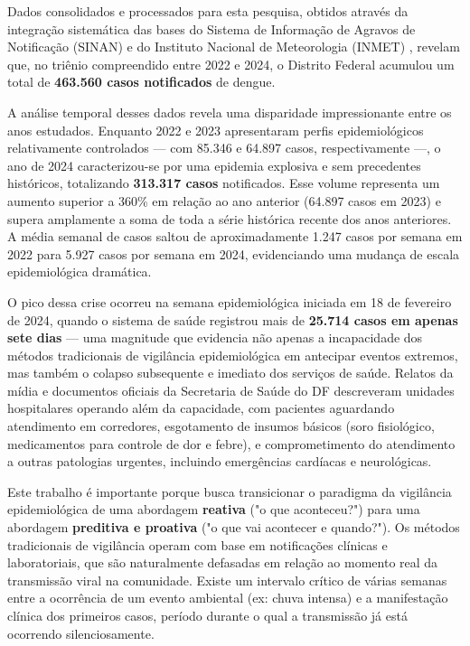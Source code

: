 Dados consolidados e processados para esta pesquisa, obtidos através da integração sistemática das bases do Sistema de Informação de Agravos de Notificação (SINAN) e do Instituto Nacional de Meteorologia (INMET) \cite{sinan2025, inmet2025}, revelam que, no triênio compreendido entre 2022 e 2024, o Distrito Federal acumulou um total de \textbf{463.560 casos notificados} de dengue. 

A análise temporal desses dados revela uma disparidade impressionante entre os anos estudados. Enquanto 2022 e 2023 apresentaram perfis epidemiológicos relativamente controlados — com 85.346 e 64.897 casos, respectivamente —, o ano de 2024 caracterizou-se por uma epidemia explosiva e sem precedentes históricos, totalizando \textbf{313.317 casos} notificados. Esse volume representa um aumento superior a 360\% em relação ao ano anterior (64.897 casos em 2023) e supera amplamente a soma de toda a série histórica recente dos anos anteriores. A média semanal de casos saltou de aproximadamente 1.247 casos por semana em 2022 para 5.927 casos por semana em 2024, evidenciando uma mudança de escala epidemiológica dramática.

O pico dessa crise ocorreu na semana epidemiológica iniciada em 18 de fevereiro de 2024, quando o sistema de saúde registrou mais de \textbf{25.714 casos em apenas sete dias} — uma magnitude que evidencia não apenas a incapacidade dos métodos tradicionais de vigilância epidemiológica em antecipar eventos extremos, mas também o colapso subsequente e imediato dos serviços de saúde. Relatos da mídia e documentos oficiais da Secretaria de Saúde do DF descreveram unidades hospitalares operando além da capacidade, com pacientes aguardando atendimento em corredores, esgotamento de insumos básicos (soro fisiológico, medicamentos para controle de dor e febre), e comprometimento do atendimento a outras patologias urgentes, incluindo emergências cardíacas e neurológicas.

Este trabalho é importante porque busca transicionar o paradigma da vigilância epidemiológica de uma abordagem \textbf{reativa} ("o que aconteceu?") para uma abordagem \textbf{preditiva e proativa} ("o que vai acontecer e quando?"). Os métodos tradicionais de vigilância operam com base em notificações clínicas e laboratoriais, que são naturalmente defasadas em relação ao momento real da transmissão viral na comunidade. Existe um intervalo crítico de várias semanas entre a ocorrência de um evento ambiental (ex: chuva intensa) e a manifestação clínica dos primeiros casos, período durante o qual a transmissão já está ocorrendo silenciosamente.

